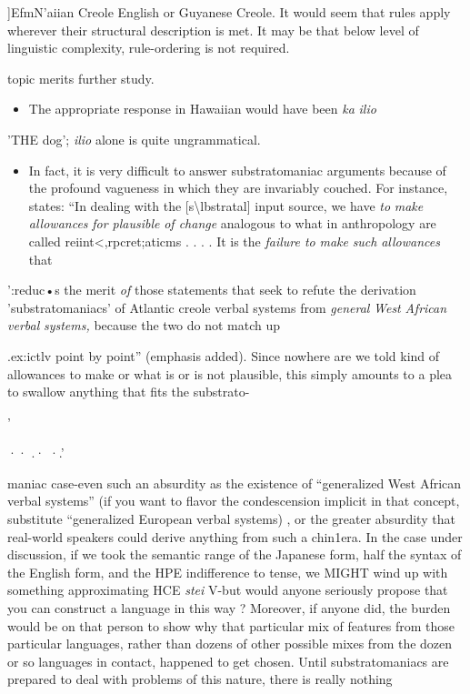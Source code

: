 ]EfmN'aiian Creole English or Guyanese Creole. It would seem that rules apply wherever their structural description is met. It may be that below level of linguistic complexity, rule-ordering is not required.

topic merits further study.

\begin{itemize}
\item The appropriate response in Hawaiian would have been \textit{ka} \textit{ilio}
\end{itemize}

'THE dog'; \textit{ilio} alone is quite ungrammatical.

\begin{itemize}
\item In fact, it is very difficult to answer substratomaniac argu\-ments because of the profound vagueness in which they are invariably couched. For instance, \citet{Alleyne1979} states: ``In dealing with the [s{\textbackslash}lbstratal] input source, we have \textit{to} \textit{make allowances} \textit{for plausible} \textit{of change }analogous to what in anthropology are called reiint{\textless},rpcret;aticms . . . . It is the \textit{failure to} \textit{make} \textit{such} \textit{allowances} that
\end{itemize}

':reduc•s the merit \textit{of} those statements that seek to refute the derivation 'substratomaniacs' of Atlantic creole verbal systems from \textit{general\-} \textit{West} \textit{African verbal} \textit{systems,} because the two do not match up

.ex:ictlv point by point'' (emphasis added). Since nowhere are we told kind of allowances to make or what is or is not plausible, this simply amounts to a plea to swallow anything that fits the substrato-

{\textquotedbl}'

·· .· ·.'


maniac case{}-even such an absurdity as the existence of ``generalized West African verbal systems'' (if you want to flavor the condescension implicit in that concept, substitute ``generalized European verbal systems{\textquotedbl}) , or the greater absurdity that real-world speakers could derive anything from such a chin1era. In the case under discussion, if we took the semantic range of the Japanese form, half the syntax of the English form, and the HPE indifference to tense, we MIGHT wind up with something approximating HCE \textit{stei} V{}-but would anyone seriously propose that you can construct a language in this way ? Moreover, if anyone did, the burden would be on that person to show why that particular mix of features from those particular languages, rather than dozens of other possible mixes from the dozen or so lan\-guages in contact, happened to get chosen. Until substratomaniacs are prepared to deal with problems of this nature, there is really nothing

